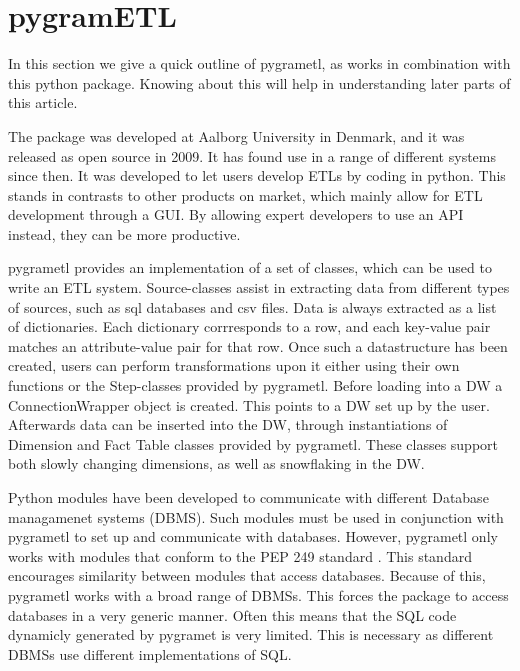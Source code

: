 \section{pygramETL}\label{sect:pygrametl}
In this section we give a quick outline of pygrametl, as \FW{} works in combination with this python package. Knowing about this will help in understanding later parts of this article. 

The package was developed at Aalborg University in Denmark, and it was released as open source in 2009. It has found use in a range of different systems since then. It was developed to let users develop ETLs by coding in python. This stands in contrasts to other products on market, which mainly allow for ETL development through a GUI. By allowing expert developers to use an API instead, they can be more productive.

pygrametl provides an implementation of a set of classes, which can be used to write an ETL system. Source-classes assist in extracting data from different types of sources, such as sql databases and csv files. Data is always extracted as a list of dictionaries. Each dictionary corrresponds to a row, and each key-value pair matches an attribute-value pair for that row. Once such a datastructure has been created, users can perform transformations upon it either using their own functions or the Step-classes provided by pygrametl. Before loading into a DW a ConnectionWrapper object is created. This points to a DW set up by the user. Afterwards data can be inserted into the DW, through instantiations of  Dimension and Fact Table classes provided by pygrametl. These classes support both slowly changing dimensions, as well as snowflaking in the DW.   

Python modules have been developed to communicate with different Database managamenet systems (DBMS). Such modules must be used in conjunction with pygrametl to set up and communicate with databases. However, pygrametl only works with modules that conform to the PEP 249 standard \cite{pep249}. This standard encourages similarity between modules that access databases. Because of this, pygrametl works with a broad range of DBMSs. This forces the package to access databases in a very generic manner. Often this means that the SQL code dynamicly generated by pygramet is very limited. This is necessary as different DBMSs use different implementations of SQL. 
    
